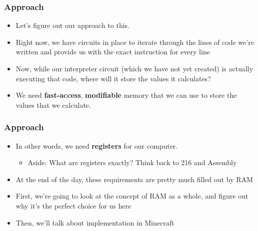 \documentclass{beamer}
\begin{document}
    		\begin{frame}
    			\frametitle{Approach}
    			\begin{itemize}
    				\item Let's figure out our approach to this.
    				\item Right now, we have circuits in place to iterate through the lines of code we're written and provide us with the exact instruction for every line
    				\item Now, while our interpreter circuit (which we have not yet created) is actually executing that code, where will it store the values it calculates?
    				\item We need \textbf{fast-access}, \textbf{modifiable} memory that we can use to store the values that we calculate.
    			\end{itemize}
    		\end{frame}
    		
    		\begin{frame}
    			\frametitle{Approach}
    			\begin{itemize}
    				\item In other words, we need \textbf{registers} for our computer.
    				\begin{itemize}
    					\item Aside: What are registers exactly? Think back to 216 and Assembly
    				\end{itemize}
    				\item At the end of the day, these requirements are pretty much filled out by RAM
    				\item First, we're going to look at the concept of RAM as a whole, and figure out why it's the perfect choice for us here
    				\item Then, we'll talk about implementation in Minecraft
    			\end{itemize}
    		\end{frame}
    		
\end{document}
